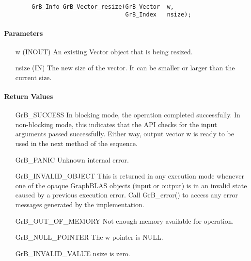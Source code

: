 \paragraph{\syntax}

\begin{verbatim}
        GrB_Info GrB_Vector_resize(GrB_Vector  w,
                                   GrB_Index   nsize);
\end{verbatim}

\paragraph{Parameters}

\begin{itemize}[leftmargin=1.1in]
    \item[{\sf w}] ({\sf INOUT}) An existing Vector object that is being resized.
    \item[{\sf nsize}] ({\sf IN}) The new size of the vector. It can be smaller or larger than the current size.
\end{itemize}

\paragraph{Return Values}

\begin{itemize}[leftmargin=2.1in]
    \item[{\sf GrB\_SUCCESS}]         In blocking mode, the operation completed
    successfully. In non-blocking mode, this indicates that the API checks 
    for the input arguments passed successfully. Either way, output vector 
    {\sf w} is ready to be used in the next method of the sequence.

    \item[{\sf GrB\_PANIC}]           Unknown internal error.
    
    \item[{\sf GrB\_INVALID\_OBJECT}] This is returned in any execution mode 
    whenever one of the opaque GraphBLAS objects (input or output) is in an invalid 
    state caused by a previous execution error.  Call {\sf GrB\_error()} to access 
    any error messages generated by the implementation.

    \item[{\sf GrB\_OUT\_OF\_MEMORY}] Not enough memory available for operation.
    
    \item[{\sf GrB\_NULL\_POINTER}]  The {\sf w} pointer is {\sf NULL}.
    
    \item[{\sf GrB\_INVALID\_VALUE}] {\sf nsize} is zero.
\end{itemize}

